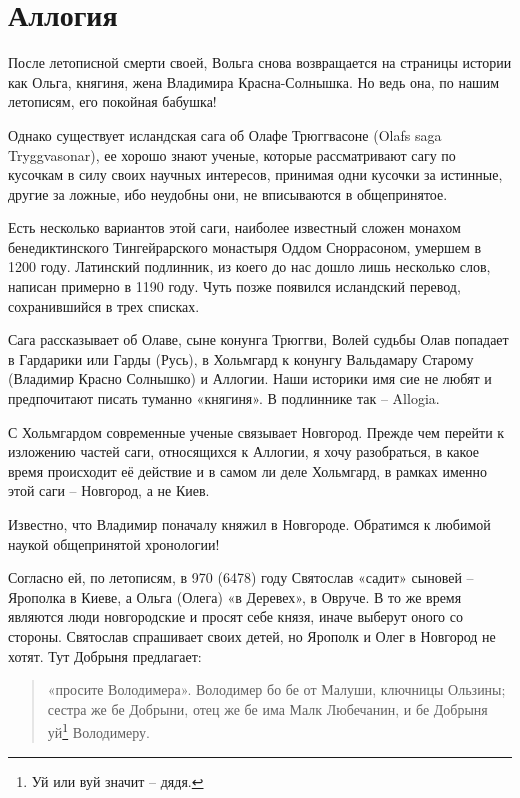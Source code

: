 \chapter{Аллогия}

После летописной смерти своей, Вольга снова возвращается на страницы истории как Ольга, княгиня, жена Владимира Красна-Солнышка. Но ведь она, по нашим летописям, его покойная бабушка!

Однако существует исландская сага об Олафе Трюггвасоне (Olafs saga Tryggvasonar)\cite{jackson01}, ее хорошо знают ученые, которые рассматривают сагу по кусочкам в силу своих научных интересов, принимая одни кусочки за истинные, другие за ложные, ибо неудобны они, не вписываются в общепринятое.



Есть несколько вариантов этой саги, наиболее известный сложен монахом бенедиктинского Тингейрарского монастыря Оддом Сноррасоном, умершем в 1200 году. Латинский подлинник, из коего до нас дошло лишь несколько слов, написан примерно в 1190 году. Чуть позже появился исландский перевод, сохранившийся в трех списках.

Сага рассказывает об Олаве, сыне конунга Трюггви, Волей судьбы Олав попадает в Гардарики или Гарды (Русь), в Хольмгард к конунгу Вальдамару Старому (Владимир Красно Солнышко) и Аллогии. Наши историки имя сие не любят и предпочитают писать туманно «княгиня». В подлиннике так – Allogia.

С Хольмгардом современные ученые связывает Новгород. Прежде чем перейти к изложению частей саги, относящихся к Аллогии, я хочу разобраться, в какое время происходит её действие и в самом ли деле Хольмгард, в рамках именно этой саги – Новгород, а не Киев.

Известно, что Владимир поначалу княжил в Новгороде. Обратимся к любимой наукой общепринятой хронологии!

Согласно ей, по летописям, в 970 (6478) году Святослав «садит» сыновей – Ярополка в Киеве, а Ольга (Олега) «в Деревех», в Овруче. В то же время являются люди новгородские и просят себе князя, иначе выберут оного со стороны. Святослав спрашивает своих детей, но Ярополк и Олег в Новгород не хотят. Тут Добрыня предлагает:

\begin{quotation}
«просите Володимера». Володимер бо бе от Малуши, ключницы Ользины; сестра же бе Добрыни, отец же бе има Малк Любечанин, и бе Добрыня уй\footnote{Уй или вуй значит – дядя.} Володимеру.
\end{quotation}

